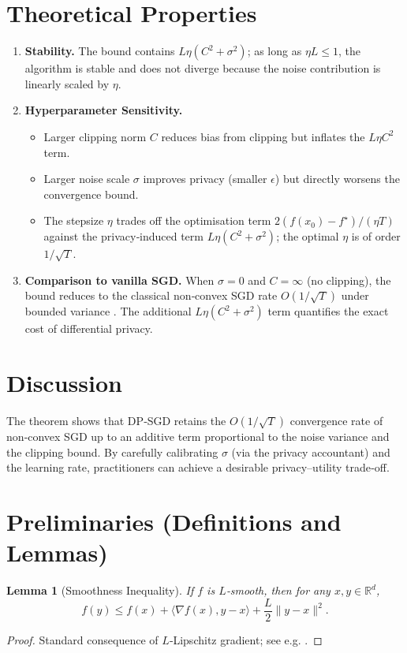 \documentclass[11pt]{article}
\newtheorem{lemma}{Lemma}
\newcommand{\R}{\mathbb{R}}
\newcommand{\grad}{\nabla}
\begin{document}
\section*{Theoretical Properties}
\begin{enumerate}[label=\textbf{P\arabic*}]
\item \textbf{Stability.} The bound contains $L\eta(C^{2}+\sigma^{2})$;
as long as $\eta L\le1$, the algorithm is stable and does not diverge because the
noise contribution is linearly scaled by $\eta$.
\item \textbf{Hyperparameter Sensitivity.}
    \begin{itemize}
        \item Larger clipping norm $C$ reduces bias from clipping but inflates the
              $L\eta C^{2}$ term.
        \item Larger noise scale $\sigma$ improves privacy (smaller $\epsilon$) but
              directly worsens the convergence bound.
        \item The stepsize $\eta$ trades off the optimisation term
              $2(f(x_0)-f^{\star})/(\eta T)$ against the privacy‑induced term
              $L\eta(C^{2}+\sigma^{2})$; the optimal $\eta$ is of order $1/\sqrt{T}$.
    \end{itemize}
\item \textbf{Comparison to vanilla SGD.}
When $\sigma=0$ and $C=\infty$ (no clipping), the bound reduces to the classical
non‑convex SGD rate $O(1/\sqrt{T})$ under bounded variance \cite{ghadimi2013}.
The additional $L\eta(C^{2}+\sigma^{2})$ term quantifies the exact cost of differential privacy.
\end{enumerate}

\section*{Discussion}
The theorem shows that DP‑SGD retains the $O(1/\sqrt{T})$ convergence rate of
non‑convex SGD up to an additive term proportional to the noise variance and
the clipping bound. By carefully calibrating $\sigma$ (via the privacy accountant)
and the learning rate, practitioners can achieve a desirable privacy–utility
trade‑off.

\newpage
\section*{Preliminaries (Definitions and Lemmas)}
\begin{lemma}[Smoothness Inequality]\label{lem:smooth}
If $f$ is $L$‑smooth, then for any $x,y\in\R^{d}$,
\[
f(y)\le f(x)+\langle\grad f(x),y-x\rangle+\frac{L}{2}\|y-x\|^{2}.
\]
\end{lemma}
\begin{proof}
Standard consequence of $L$‑Lipschitz gradient; see e.g. \cite{nesterov2004}.
\end{proof}
\end{document}
